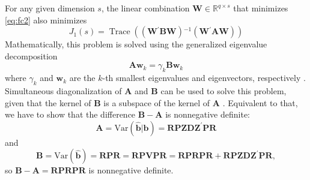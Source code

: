 \documentclass[12pt]{article} %
\newcommand{\hh}[1]{{\color{orange} #1}}
\newcommand{\inv}{\ensuremath{^{-1}}}
\newcommand{\trans}{\ensuremath{^\prime}}
\newcommand{\var}{\ensuremath{\mathrm{Var}}}
\DeclareMathOperator{\tr}{Trace}
\begin{document}
{For any given dimension $s$, the linear combination $\bm{W} \in \mathbb{R}^{q \times s}$ that minimizes \eqref{eq:fc2} also minimizes
%
\begin{equation}\label{eq:minimize}
J_1(s) = \tr\left( \left(\bm{W\trans B W} \right)\inv \left(\bm{W\trans A W}\right) \right)
\end{equation}
%
Mathematically, this problem is solved using the generalized eigenvalue decomposition
%
\begin{equation}\label{eq:geigen}
	\bm{Aw}_k = \gamma_k \bm{Bw}_k
\end{equation}
%
where $\gamma_k$ and $\bm{w}_k$ are the $k$-th smallest eigenvalues and eigenvectors, respectively \citep{Fukunaga:1990}. 
\hh{Simultaneous diagonalization of $\bm{A}$ and $\bm{B}$ can be used to solve this problem, given that the kernel of $\bm{B}$ is a subspace of the kernel of $\bm{A}$ \citep{deLeeuw:1982to}.
Equivalent to that, we have to show that the difference $\bm{B} - \bm{A}$ is nonnegative definite:
\[
	\bm{A} =  \var(\widehat{\bm{b}} | \bm{b} ) = \bm{RPZDZ}^\prime \bm{PR}
\]
and
\[
	\bm{B} = \var(\widehat{\bm{b}}) =  \bm{RPR} =  \bm{RPVPR}  = \bm{RPRPR} + \bm{RPZDZ}^\prime\bm{PR},
\]
so $\bm{B}-\bm{A} =  \bm{RPRPR}$ is nonnegative definite.
}

%

}
\end{document}
